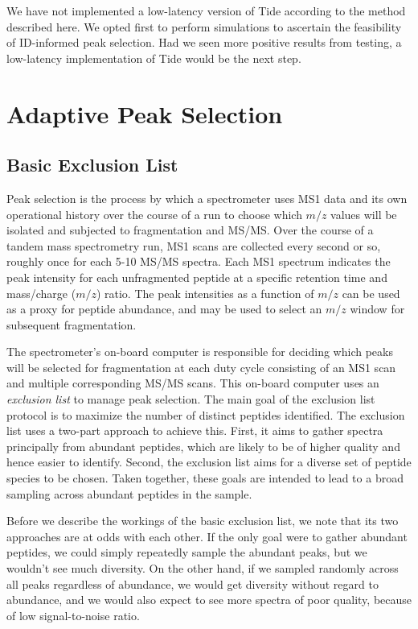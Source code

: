 \documentclass[12pt,twoside,openright]{report}
\begin{document}
We have not implemented a low-latency version of Tide according to the method
described here. We opted first to perform simulations to ascertain the
feasibility of ID-informed peak selection. Had we seen more positive results from
testing, a low-latency implementation of Tide would be the next step.

\section{Adaptive Peak Selection} %
\label{section:adaptivepeak}

\subsection{Basic Exclusion List}

Peak selection is the process by which a spectrometer uses MS1 data and its own
operational history over the course of a run to choose which $m/z$ values will
be isolated and subjected to fragmentation and MS/MS. Over the course of a
tandem mass spectrometry run, MS1 scans are collected every second or so,
roughly once for each 5-10 MS/MS spectra. Each MS1 spectrum indicates the peak
intensity for each unfragmented peptide at a specific retention time and
mass/charge ($m/z$) ratio. The peak intensities as a function of $m/z$ can be
used as a proxy for peptide abundance, and may be used to select an $m/z$ window
for subsequent fragmentation.

The spectrometer's on-board computer is responsible for deciding which peaks
will be selected for fragmentation at each duty cycle consisting of an MS1 scan
and multiple corresponding MS/MS scans.  This on-board computer uses an {\it
  exclusion list} to manage peak selection. The main goal of the exclusion list
protocol is to maximize the number of distinct peptides identified. The
exclusion list uses a two-part approach to achieve this. First, it aims to
gather spectra principally from abundant peptides, which are likely to be of
higher quality and hence easier to identify.  Second, the exclusion list aims
for a diverse set of peptide species to be chosen. Taken together, these goals
are intended to lead to a broad sampling across abundant peptides in the sample.

Before we describe the workings of the basic exclusion list, we note that its
two approaches are at odds with each other. If the only goal were to gather
abundant peptides, we could simply repeatedly sample the abundant peaks, but we
wouldn't see much diversity. On the other hand, if we sampled randomly across
all peaks regardless of abundance, we would get diversity without regard to
abundance, and we would also expect to see more spectra of poor quality, because
of low signal-to-noise ratio.
\end{document}
